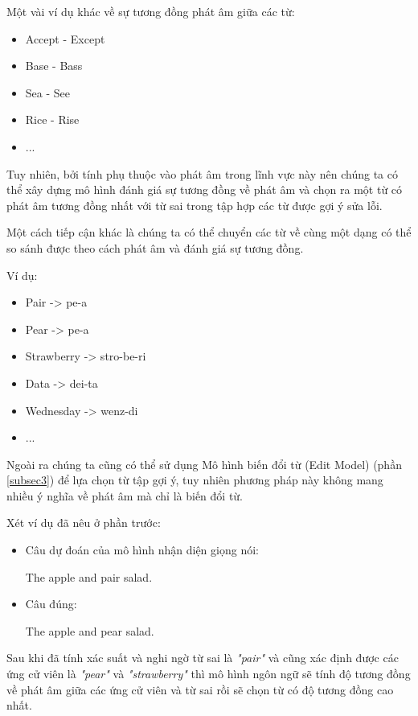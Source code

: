 Một vài ví dụ khác về sự tương đồng phát âm giữa các từ:
\begin{itemize}
    \item Accept - Except
    \item Base - Bass
    \item Sea - See
    \item Rice - Rise
    \item ...
\end{itemize}

Tuy nhiên, bởi tính phụ thuộc vào phát âm trong lĩnh vực này nên chúng ta có thể xây dựng mô hình đánh giá sự tương đồng về phát âm và chọn ra một từ có phát âm tương đồng nhất với từ sai trong tập hợp các từ được gợi ý sửa lỗi.

Một cách tiếp cận khác là chúng ta có thể chuyển các từ về cùng một dạng có thể so sánh được theo cách phát âm và đánh giá sự tương đồng.

Ví dụ:
\begin{itemize}
    \item Pair -> pe-a
    \item Pear -> pe-a
    \item Strawberry -> stro-be-ri
    \item Data -> dei-ta
    \item Wednesday -> wenz-di
    \item ...
\end{itemize}

Ngoài ra chúng ta cũng có thể sử dụng Mô hình biến đổi từ (Edit Model) (phần \ref{subsec3}) để lựa chọn từ tập gợi ý, tuy nhiên phương pháp này không mang nhiều ý nghĩa về phát âm mà chỉ là biến đổi từ.

Xét ví dụ đã nêu ở phần trước:
\begin{itemize}
    \item Câu dự đoán của mô hình nhận diện giọng nói:
    \begin{center}
    The apple and pair salad.
    \end{center}
    \item Câu đúng:
    \begin{center}
    The apple and pear salad.
    \end{center}
\end{itemize}

Sau khi đã tính xác suất và nghi ngờ từ sai là \textit{"pair"} và cũng xác định được các ứng cử viên là \textit{"pear"} và \textit{"strawberry"} thì mô hình ngôn ngữ sẽ tính độ tương đồng về phát âm giữa các ứng cử viên và từ sai rồi sẽ chọn từ có độ tương đồng cao nhất.

